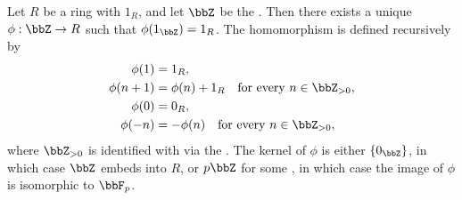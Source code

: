 \begin{theorem} \label{theorem:integers_universal_property_ring_of_integers_is_the_initial_object_in_the_category_of_rings}
    Let $R$ be a ring with  $1_R$, and let $\bbZ$ be the . Then there exists a unique  $\phi: \bbZ \to R$ such that $\phi(1_\bbZ) = 1_R$. The homomorphism is defined recursively by
    \begin{align*}
        \phi(1) &= 1_R, \\
        \phi(n+1) &= \phi(n) + 1_R \quad\text{for every } n \in \bbZ_{> 0}, \\
        \phi(0) &= 0_R, \\
        \phi(-n) &= -\phi(n) \quad\text{for every } n \in \bbZ_{> 0},
    \end{align*}
    where $\bbZ_{> 0}$ is identified with  via the .
    The kernel of $\phi$ is either $\{0_\bbZ\}$, in which case $\bbZ$ embeds into $R$, or $p\bbZ$ for some , in which case the image of $\phi$ is isomorphic to $\bbF_p$.

\end{theorem}

